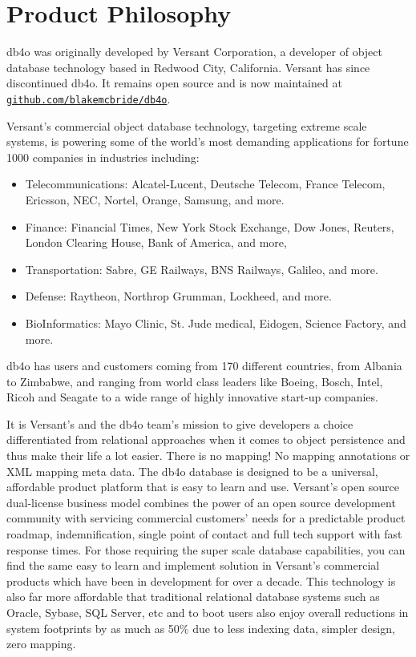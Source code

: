 
\chapter{Product Philosophy}
\label{ref:product-philosophy}

db4o was originally developed by Versant Corporation, a developer of object database technology based in Redwood City, California. Versant has since discontinued db4o. It remains open source and is now maintained at \href{https://github.com/blakemcbride/db4o}{\nolinkurl{github.com/blakemcbride/db4o}}.

Versant's commercial object database technology, targeting extreme scale systems, is powering some of the world's most demanding applications for fortune 1000 companies in industries including:

\begin{itemize}
\item Telecommunications: Alcatel-Lucent, Deutsche Telecom, France Telecom, Ericsson, NEC, Nortel, Orange, Samsung, and more.
\item Finance: Financial Times, New York Stock Exchange, Dow Jones, Reuters, London Clearing House, Bank of America, and more,
\item Transportation: Sabre, GE Railways, BNS Railways, Galileo, and more.
\item Defense: Raytheon, Northrop Grumman, Lockheed, and more.
\item BioInformatics: Mayo Clinic, St. Jude medical, Eidogen, Science Factory, and more.
\end{itemize}

db4o has users and customers coming from 170 different countries, from Albania to Zimbabwe, and ranging from world class leaders like Boeing, Bosch, Intel, Ricoh and Seagate to a wide range of highly innovative start-up companies.

It is Versant's and the db4o team's mission to give developers a choice differentiated from relational approaches when it comes to object persistence and thus make their life a lot easier. There is no mapping! No mapping annotations or XML mapping meta data. The db4o database is designed to be a universal, affordable product platform that is easy to learn and use. Versant's open source dual-license business model combines the power of an open source development community with servicing commercial customers' needs for a predictable product roadmap, indemnification, single point of contact and full tech support with fast response times. For those requiring the super scale database capabilities, you can find the same easy to learn and implement solution in Versant's commercial products which have been in development for over a decade. This technology is also far more affordable that traditional relational database systems such as Oracle, Sybase, SQL Server, etc and to boot users also enjoy overall reductions in system footprints by as much as 50\% due to less indexing data, simpler design, zero mapping.

